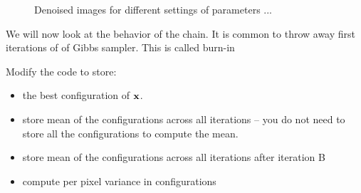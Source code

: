 \documentclass{article}
\begin{document}
\begin{figure}
\begin{tabular}{ccc}
\end{tabular}
\caption{Denoised images for different settings of parameters ...}
\end{figure}

\newproblem{2pt}
We will now look at the behavior of the chain.
It is common to throw away first iterations of of Gibbs sampler. This is called burn-in

Modify the code to store:
\begin{itemize}
\item the best configuration of $\mathbf{x}$.
\item store mean of the configurations across all iterations -- you do not need to store all the
configurations to compute the mean.
\item store mean of the configurations across all iterations after iteration B
\item compute per pixel variance in configurations
\end{itemize}
\end{document}
